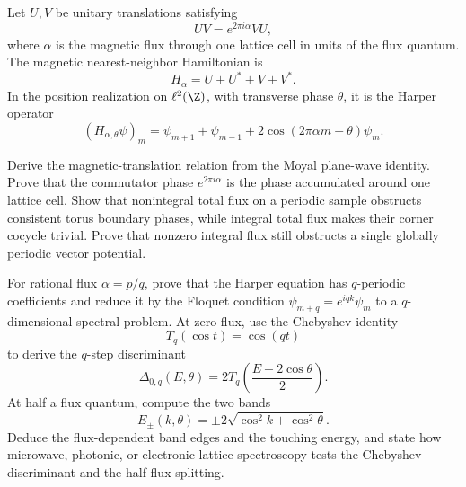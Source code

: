 \begin{exercise}
Let $U,V$ be unitary translations satisfying
\[
UV=e^{2\pi i\alpha}VU,
\]
where $\alpha$ is the magnetic flux through one lattice cell in units of
the flux quantum.  The magnetic nearest-neighbor Hamiltonian is
\[
H_\alpha=U+U^*+V+V^*.
\]
In the position realization on $\ell^2(\Z)$, with transverse phase
$\theta$, it is the Harper operator
\[
(H_{\alpha,\theta}\psi)_m
=\psi_{m+1}+\psi_{m-1}
+2\cos(2\pi\alpha m+\theta)\psi_m.
\]

Derive the magnetic-translation relation from the Moyal plane-wave
identity.  Prove that the commutator phase $e^{2\pi i\alpha}$ is the phase
accumulated around one lattice cell.  Show that nonintegral total flux on a
periodic sample obstructs consistent torus boundary phases, while integral
total flux makes their corner cocycle trivial.  Prove that nonzero integral
flux still obstructs a single globally periodic vector potential.

For rational flux $\alpha=p/q$, prove that the Harper equation
has $q$-periodic coefficients and reduce it by the Floquet condition
$\psi_{m+q}=e^{iqk}\psi_m$ to a $q$-dimensional spectral problem.
At zero flux, use the Chebyshev identity
\[
T_q(\cos t)=\cos(qt)
\]
to derive the $q$-step discriminant
\[
\Delta_{0,q}(E,\theta)
=2T_q\!\left(\frac{E-2\cos\theta}{2}\right).
\]
At half a flux quantum, compute the two bands
\[
E_\pm(k,\theta)
=\pm2\sqrt{\cos^2k+\cos^2\theta}.
\]
Deduce the flux-dependent band edges and the touching energy, and state
how microwave, photonic, or electronic lattice spectroscopy tests the
Chebyshev discriminant and the half-flux splitting.
\end{exercise}
